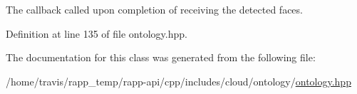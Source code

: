 The callback called upon completion of receiving the detected faces. 



Definition at line 135 of file ontology.\-hpp.



The documentation for this class was generated from the following file\-:\begin{DoxyCompactItemize}
\item 
/home/travis/rapp\-\_\-temp/rapp-\/api/cpp/includes/cloud/ontology/\hyperlink{ontology_8hpp}{ontology.\-hpp}\end{DoxyCompactItemize}
